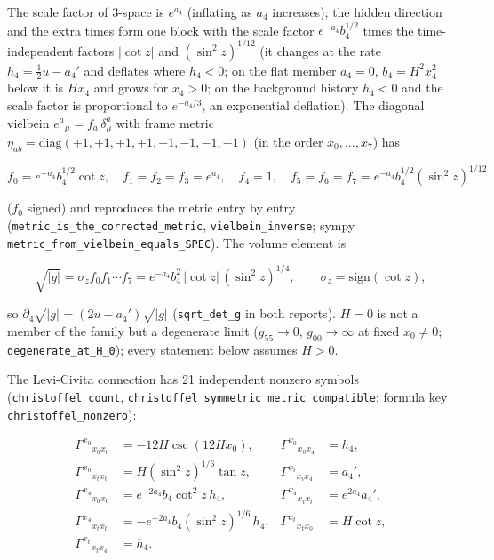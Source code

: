 \documentclass[11pt]{article}
\begin{document}
The scale factor of 3-space is $e^{a_4}$ (inflating as $a_4$ increases); the hidden direction and the extra times form one block with the scale factor $e^{-a_4}b_4^{1/2}$ times the time-independent factors $|\cot z|$ and $(\sin^2 z)^{1/12}$ (it changes at the rate $h_4 = \tfrac12u - a_4'$ and deflates where $h_4 < 0$; on the flat member $a_4 = 0$, $b_4 = H^2x_4^2$ below it is $Hx_4$ and grows for $x_4 > 0$; on the background history $h_4 < 0$ and the scale factor is proportional to $e^{-a_4/3}$, an exponential deflation). The diagonal vielbein $e^a{}_\mu = f_a\,\delta^a_\mu$ with frame metric $\eta_{ab} = \mathrm{diag}(+1, +1, +1, +1, -1, -1, -1, -1)$ (in the order $x_0, \dots, x_7$) has

\[
f_0 = e^{-a_4}b_4^{1/2}\cot z,\quad f_1 = f_2 = f_3 = e^{a_4},\quad f_4 = 1,\quad f_5 = f_6 = f_7 = e^{-a_4}b_4^{1/2}(\sin^2 z)^{1/12}
\]

($f_0$ signed) and reproduces the metric entry by entry (\texttt{metric\_i\allowbreak{}s\_the\_co\allowbreak{}rrected\_\allowbreak{}metric}, \texttt{vielbein\allowbreak{}\_inverse}; sympy \texttt{metric\_f\allowbreak{}rom\_viel\allowbreak{}bein\_equ\allowbreak{}als\_SPEC}). The volume element is

\[
\sqrt{|g|} = \sigma_z f_0 f_1\cdots f_7 = e^{-a_4}b_4^2\,|\cot z|\,(\sin^2 z)^{1/4},\qquad \sigma_z = \mathrm{sign}(\cot z),
\]

so $\partial_4\sqrt{|g|} = (2u - a_4')\sqrt{|g|}$ (\texttt{sqrt\_det\allowbreak{}\_g} in both reports). $H = 0$ is not a member of the family but a degenerate limit ($g_{55} \to 0$, $g_{00} \to \infty$ at fixed $x_0 \neq 0$; \texttt{degenera\allowbreak{}te\_at\_H\_\allowbreak{}0}); every statement below assumes $H > 0$.

The Levi-Civita connection has 21 independent nonzero symbols (\texttt{christof\allowbreak{}fel\_coun\allowbreak{}t}, \texttt{christof\allowbreak{}fel\_symm\allowbreak{}etric\_me\allowbreak{}tric\_com\allowbreak{}patible}; formula key \texttt{christof\allowbreak{}fel\_nonz\allowbreak{}ero}):

\[
\begin{aligned}
\Gamma^{x_0}{}_{x_0 x_0} &= -12H\csc(12Hx_0), & \Gamma^{x_0}{}_{x_0 x_4} &= h_4, \\
\Gamma^{x_0}{}_{x_t x_t} &= H(\sin^2 z)^{1/6}\tan z, & \Gamma^{x_i}{}_{x_i x_4} &= a_4', \\
\Gamma^{x_4}{}_{x_0 x_0} &= e^{-2a_4}b_4\cot^2 z\,h_4, & \Gamma^{x_4}{}_{x_i x_i} &= e^{2a_4}a_4', \\
\Gamma^{x_4}{}_{x_t x_t} &= -e^{-2a_4}b_4(\sin^2 z)^{1/6}\,h_4, & \Gamma^{x_t}{}_{x_t x_0} &= H\cot z, \\
\Gamma^{x_t}{}_{x_t x_4} &= h_4 .
\end{aligned}
\]
\end{document}
